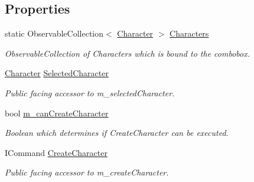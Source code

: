 \subsection*{Properties}
\begin{DoxyCompactItemize}
\item 
static Observable\+Collection$<$ \mbox{\hyperlink{class_dungeons__n___dragons___manager_1_1_models_1_1_character}{Character}} $>$ \mbox{\hyperlink{class_dungeons__n___dragons___manager_1_1_viewmodels_1_1_characters_tab_viewmodel_a0338689d77ddb4ecb65be14b8dd22293}{Characters}}
\begin{DoxyCompactList}\small\item\em Observable\+Collection of Characters which is bound to the combobox. \end{DoxyCompactList}\item 
\mbox{\hyperlink{class_dungeons__n___dragons___manager_1_1_models_1_1_character}{Character}} \mbox{\hyperlink{class_dungeons__n___dragons___manager_1_1_viewmodels_1_1_characters_tab_viewmodel_a86d14e10197a73a19117e9623e555232}{Selected\+Character}}
\begin{DoxyCompactList}\small\item\em Public facing accessor to m\+\_\+selected\+Character. \end{DoxyCompactList}\item 
bool \mbox{\hyperlink{class_dungeons__n___dragons___manager_1_1_viewmodels_1_1_characters_tab_viewmodel_ae8fd6fa7f56d81e7fb070a958d0cad26}{m\+\_\+can\+Create\+Character}}
\begin{DoxyCompactList}\small\item\em Boolean which determines if Create\+Character can be executed. \end{DoxyCompactList}\item 
I\+Command \mbox{\hyperlink{class_dungeons__n___dragons___manager_1_1_viewmodels_1_1_characters_tab_viewmodel_a768c908827859bd2cab0651a40e8f729}{Create\+Character}}
\begin{DoxyCompactList}\small\item\em Public facing accessor to m\+\_\+create\+Character. \end{DoxyCompactList}\end{DoxyCompactItemize}
